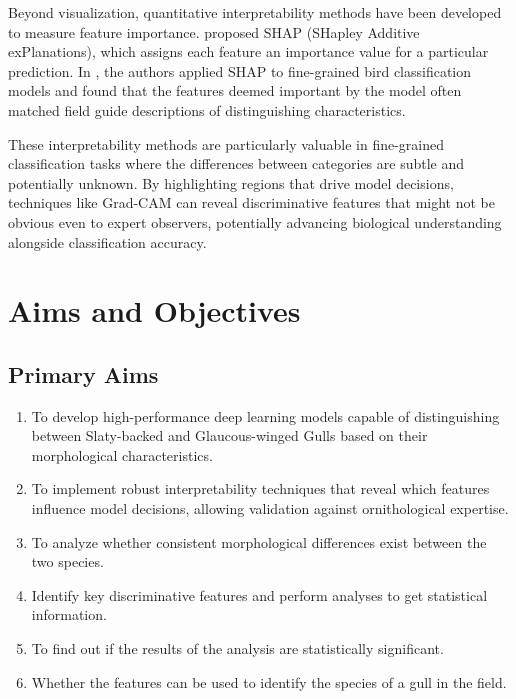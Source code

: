 \documentclass[a4paper,12pt]{report}
\begin{document}

Beyond visualization, quantitative interpretability methods have been developed to measure feature importance. \citep{lundberg2017unified} proposed SHAP (SHapley Additive exPlanations), which assigns each feature an importance value for a particular prediction. In \citep{chen2019looks}, the authors applied SHAP to fine-grained bird classification models and found that the features deemed important by the model often matched field guide descriptions of distinguishing characteristics.

These interpretability methods are particularly valuable in fine-grained classification tasks where the differences between categories are subtle and potentially unknown. By highlighting regions that drive model decisions, techniques like Grad-CAM can reveal discriminative features that might not be obvious even to expert observers, potentially advancing biological understanding alongside classification accuracy.



\chapter{Aims and Objectives}

\section{Primary Aims}
\begin{enumerate}
    \item To develop high-performance deep learning models capable of distinguishing between Slaty-backed and Glaucous-winged Gulls based on their morphological characteristics.
    \item To implement robust interpretability techniques that reveal which features influence model decisions, allowing validation against ornithological expertise.
    \item To analyze whether consistent morphological differences exist between the two species. 
    \item Identify key discriminative features and perform analyses to get statistical information.
    \item To find out if the results of the analysis are statistically significant.
    \item Whether the features can be used to identify the species of a gull in the field.
\end{enumerate}
\end{document}
